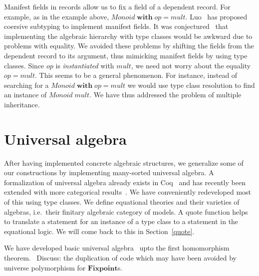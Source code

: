 \documentclass[a4paper,10pt, runningheads]{llncs}
\newcommand{\Conid}[1]{\mathit{#1}}
\newcommand{\Varid}[1]{\mathit{#1}}
\begin{document}
Manifest fields in records allow us to fix a field of a dependent record. For example, as in the
example above, \ensuremath{\Conid{Monoid}\;\mathbf{with}\;\Varid{op=mult}}. 
Luo~\cite{DBLP:conf/types/Luo08} has proposed coersive subtyping to implement manifest fields.
It was conjectured~\cite{Hints} that implementing the algebraic hierarchy with type classes would
be awkward due to problems with equality. We avoided these problems by shifting the fields
from the dependent record to its argument, thus mimicking manifest fields by using type classes.
Since \ensuremath{\Varid{op}} is \emph{instantiated} with \ensuremath{\Varid{mult}}, we need not worry about the
equality \ensuremath{\Varid{op=mult}}. This seems to be a general phenomenon. For instance, instead of searching
for a \ensuremath{\Conid{Monoid}\;\mathbf{with}\;\Varid{op=mult}} we would use type class resolution to find an instance of \ensuremath{\Conid{Monoid}\;\Varid{mult}}.
We have thus addressed the problem of multiple inheritance.

\section{Universal algebra}\label{univ}
After having implemented concrete algebraic structures, we generalize some of our constructions
by implementing many-sorted universal algebra. A formalization of universal algebra
already exists in Coq~\cite{DBLP:conf/tphol/Capretta99} and has recently been extended with
more categorical results~\cite{dominguez2008formalizing}. We have conveniently redeveloped most of
this using type classes. We define equational theories and their varieties of algebras, i.e.\ their
finitary algebraic category of models. A quote function helps to translate a statement for an
instance of
a type class to a statement in the equational logic. We will come back to this in
Section~\ref{quote}.


We have developed basic universal algebra~\cite{meinke1993universal} upto the first homomorphism
theorem.~
Discuss: the duplication of code which may have been avoided by universe
polymorphism for \ensuremath{\mathbf{Fixpoint}}s.
\end{document}

